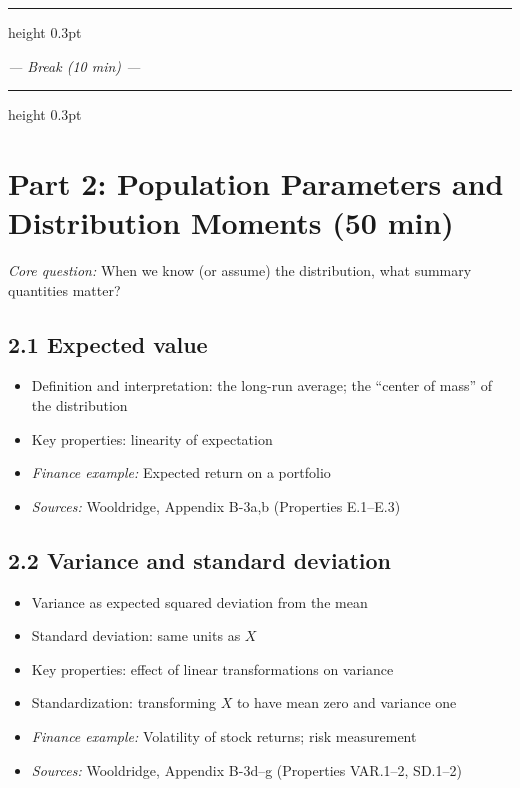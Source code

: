\documentclass[letterpaper,10pt]{article}
\begin{document}

\vspace{0.5em}
\hrule height 0.3pt
\vspace{0.5em}
\begin{center}\textit{--- Break (10 min) ---}\end{center}
\vspace{0.5em}
\hrule height 0.3pt
\vspace{1em}

\section*{Part 2: Population Parameters and Distribution Moments \hfill \normalsize\textnormal{(50 min)}}

\noindent\textit{Core question:} When we know (or assume) the distribution, what summary quantities matter?

\subsection*{2.1 Expected value}
\begin{itemize}
    \item Definition and interpretation: the long-run average; the ``center of mass'' of the distribution
    \item Key properties: linearity of expectation
    \item \textit{Finance example:} Expected return on a portfolio
    \item \textit{Sources:} Wooldridge, Appendix B-3a,b (Properties E.1--E.3)
\end{itemize}

\subsection*{2.2 Variance and standard deviation}
\begin{itemize}
    \item Variance as expected squared deviation from the mean
    \item Standard deviation: same units as $X$
    \item Key properties: effect of linear transformations on variance
    \item Standardization: transforming $X$ to have mean zero and variance one
    \item \textit{Finance example:} Volatility of stock returns; risk measurement
    \item \textit{Sources:} Wooldridge, Appendix B-3d--g (Properties VAR.1--2, SD.1--2)
\end{itemize}
\end{document}
